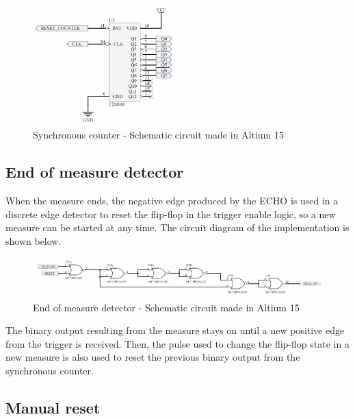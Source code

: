 \begin{figure}[H]
    \begin{centering}
    \includegraphics[width=0.5\textwidth]{Unit_Counter}
    \par\end{centering}
    \caption{Synchronous counter - Schematic circuit made in Altium 15}
\end{figure}

\subsection*{End of measure detector}

When the measure ends, the negative edge produced by the ECHO is used in a discrete edge detector 
to reset the flip-flop in the trigger enable logic, so a new measure can be started at any time.
The circuit diagram of the implementation is shown below.

\begin{figure}[H]
    \begin{centering}
    \includegraphics[width=1\textwidth]{Meas_End}
    \par\end{centering}
    \caption{End of measure detector - Schematic circuit made in Altium 15}
\end{figure}

The binary output resulting from the measure stays on until a new positive edge from the trigger is 
received. Then, the pulse used to change the flip-flop state in a new measure is also used to reset
the previous binary output from the synchronous counter.

\subsection*{Manual reset}

